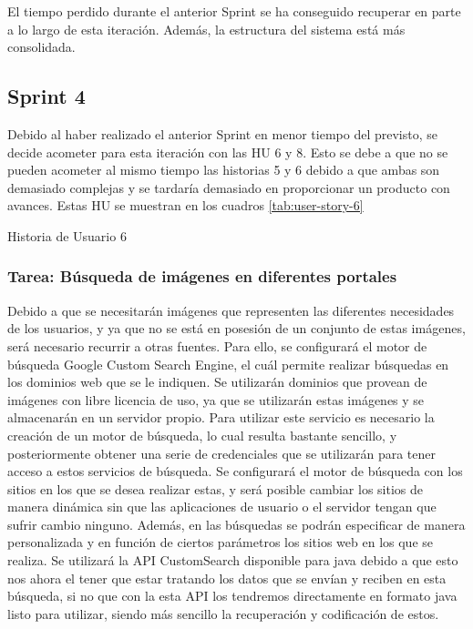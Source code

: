El tiempo perdido durante el anterior Sprint se ha conseguido recuperar en parte a lo largo de esta iteración. Además, la estructura del sistema está más consolidada.

\subsection{Sprint 4}

Debido al haber realizado el anterior Sprint en menor tiempo del previsto, se decide acometer para esta iteración con las \ac{HU} 6 y 8. Esto se debe a que no se pueden acometer al mismo tiempo las historias 5 y 6 debido a que ambas son demasiado complejas y se tardaría demasiado en proporcionar un producto con avances. Estas \ac{HU} se muestran en los cuadros \ref{tab:user-story-6}

\begin{table}[hp]
  \centering
  {\small
  
  }
  \caption{Historia de Usuario 6}
  \label{tab:user-story-6}
\end{table}


\subsubsection{Tarea: Búsqueda de imágenes en diferentes portales}

Debido a que se necesitarán imágenes que representen las diferentes necesidades de los usuarios, y ya que no se está en posesión de un conjunto de estas imágenes, será necesario recurrir a otras fuentes. Para ello, se configurará el motor de búsqueda Google Custom Search Engine, el cuál permite realizar búsquedas en los dominios web que se le indiquen. Se utilizarán dominios que provean de imágenes con libre licencia de uso, ya que se utilizarán estas imágenes y se almacenarán en un servidor propio. Para utilizar este servicio es necesario la creación de un motor de búsqueda, lo cual resulta bastante sencillo, y posteriormente obtener una serie de credenciales que se utilizarán para tener acceso a estos servicios de búsqueda. Se configurará el motor de búsqueda con los sitios en los que se desea realizar estas, y será posible cambiar los sitios de manera dinámica sin que las aplicaciones de usuario o el servidor tengan que sufrir cambio ninguno. Además, en las búsquedas se podrán especificar de manera personalizada y en función de ciertos parámetros los sitios web en los que se realiza. Se utilizará la \ac{API} CustomSearch disponible para java debido a que esto nos ahora el tener que estar tratando los datos que se envían y reciben en esta búsqueda, si no que con la esta \ac{API} los tendremos directamente en formato java listo para utilizar, siendo más sencillo la recuperación y codificación de estos.

